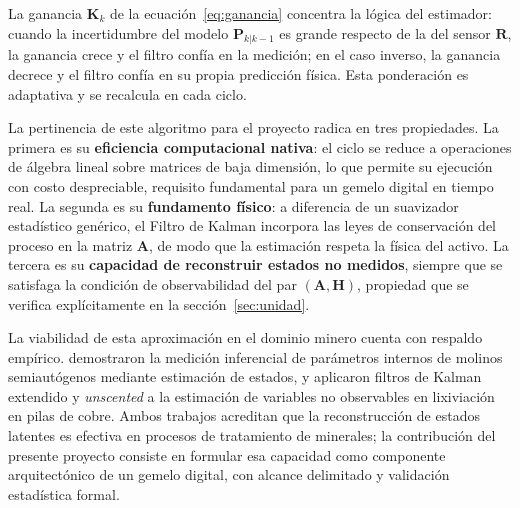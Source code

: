 La ganancia $\mathbf{K}_{k}$ de la ecuación~\eqref{eq:ganancia} concentra la
lógica del estimador: cuando la incertidumbre del modelo $\mathbf{P}_{k|k-1}$ es
grande respecto de la del sensor $\mathbf{R}$, la ganancia crece y el filtro
confía en la medición; en el caso inverso, la ganancia decrece y el filtro
confía en su propia predicción física. Esta ponderación es adaptativa y se
recalcula en cada ciclo.

La pertinencia de este algoritmo para el proyecto radica en tres propiedades. La
primera es su \textbf{eficiencia computacional nativa}: el ciclo se reduce a
operaciones de álgebra lineal sobre matrices de baja dimensión, lo que permite
su ejecución con costo despreciable, requisito fundamental para un gemelo digital
en tiempo real. La segunda es su \textbf{fundamento físico}: a diferencia de un
suavizador estadístico genérico, el Filtro de Kalman incorpora las leyes de
conservación del proceso en la matriz $\mathbf{A}$, de modo que la estimación
respeta la física del activo. La tercera es su \textbf{capacidad de reconstruir
estados no medidos}, siempre que se satisfaga la condición de observabilidad del
par $(\mathbf{A}, \mathbf{H})$, propiedad que se verifica explícitamente en la
sección~\ref{sec:unidad}.

La viabilidad de esta aproximación en el dominio minero cuenta con respaldo
empírico. \textcite{apelt2002} demostraron la medición inferencial de parámetros
internos de molinos semiautógenos mediante estimación de estados, y
\textcite{barzaga2025} aplicaron filtros de Kalman extendido y \emph{unscented}
a la estimación de variables no observables en lixiviación en pilas de cobre.
Ambos trabajos acreditan que la reconstrucción de estados latentes es efectiva
en procesos de tratamiento de minerales; la contribución del presente proyecto
consiste en formular esa capacidad como componente arquitectónico de un gemelo
digital, con alcance delimitado y validación estadística formal.
